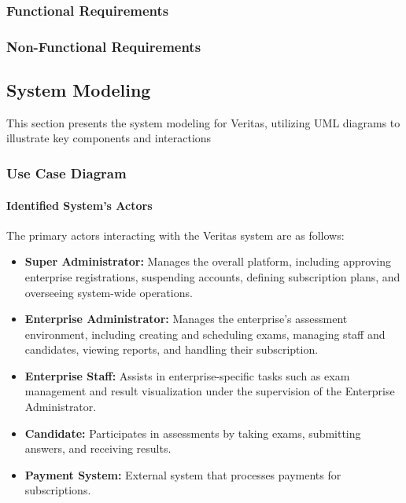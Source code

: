 \begin{landscape}
\subsubsection{Functional Requirements}

\label{sec:functional-requirements}

\vspace{1cm}

\subsubsection{Non-Functional Requirements}

\label{sec:non-functional-requirements}
\end{landscape}
\clearpage

\subsection{System Modeling}
This section presents the system modeling for Veritas, utilizing UML diagrams to illustrate key components and interactions

\subsubsection{Use Case Diagram}
\paragraph*{Identified System's Actors}
The primary actors interacting with the Veritas system are as follows:
\begin{itemize}
    \item \textbf{Super Administrator:} Manages the overall platform, including approving enterprise registrations, suspending accounts, defining subscription plans, and overseeing system-wide operations.
    \item \textbf{Enterprise Administrator:} Manages the enterprise's assessment environment, including creating and scheduling exams, managing staff and candidates, viewing reports, and handling their subscription.
    \item \textbf{Enterprise Staff:} Assists in enterprise-specific tasks such as exam management and result visualization under the supervision of the Enterprise Administrator.
    \item \textbf{Candidate:} Participates in assessments by taking exams, submitting answers, and receiving results.
    \item \textbf{Payment System:} External system that processes payments for subscriptions.
\end{itemize}

